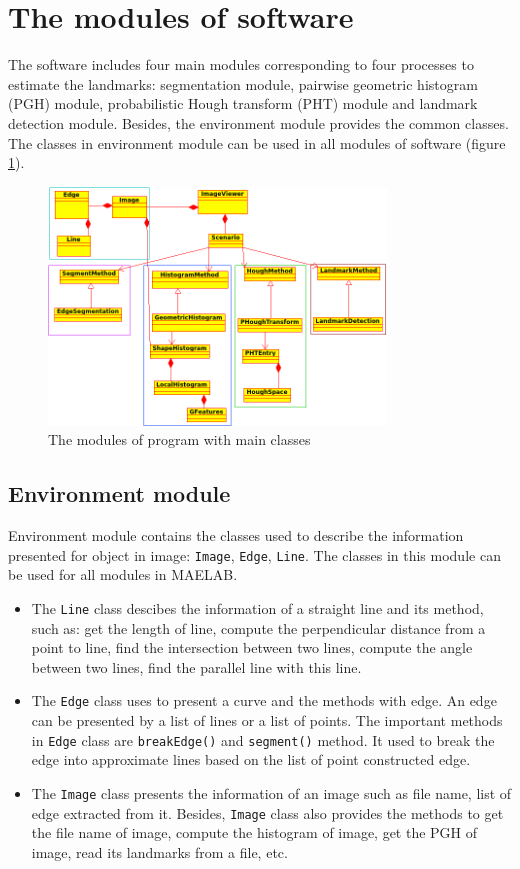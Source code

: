 \section{The modules of software}
The software includes four main modules corresponding to four processes to estimate the landmarks: segmentation module, pairwise geometric histogram (PGH) module, probabilistic Hough transform (PHT) module and landmark detection module. Besides, the environment module provides the common classes. The classes in environment module can be used in all modules of software (figure \ref{fig:41}).
\begin{figure}[h!]
\centering
\includegraphics[width=0.8\textwidth]{./images/modules}
\caption{The modules of program with main classes}
\label{fig:41}
\end{figure}
\subsection*{Environment module}
Environment module contains the classes used to describe the information presented for object in image: \texttt{Image}, \texttt{Edge}, \texttt{Line}. The classes in this module can be used for all modules in MAELAB.
\begin{itemize}
\item The \texttt{Line} class descibes the information of a straight line and its method, such as: get the length of line, compute the perpendicular distance from a point to line, find the intersection between two lines, compute the angle between two lines, find the parallel line with this line.
\item The \texttt{Edge} class uses to present a curve and the methods with edge. An edge can be presented by a list of lines or a list of points. The important methods in \texttt{Edge} class are \texttt{breakEdge()} and \texttt{segment()} method. It used to break the edge into approximate lines based on the list of point constructed edge.
\item The \texttt{Image} class presents the information of an image such as file name, list of edge extracted from it. Besides, \texttt{Image} class also provides the methods to get the file name of image, compute the histogram of image, get the PGH of image, read its landmarks from a file, etc.
\end{itemize}
